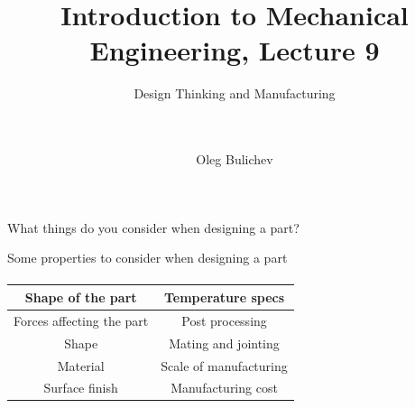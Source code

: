 \documentclass[aspectratio=169]{beamer}
\title[IME]{Introduction to Mechanical Engineering, Lecture 9} %
\subtitle{Design Thinking and Manufacturing  
\\ \   \\   
\ } %
\author{Oleg Bulichev}
\newcommand{\fbckg}[1]{\usebackgroundtemplate{\texttt{[image: \#1]}}}%
\begin{document}
\setlength{\abovedisplayskip}{0pt}
\setlength{\belowdisplayskip}{0pt}
\setlength{\abovedisplayshortskip}{0pt}
\setlength{\belowdisplayshortskip}{0pt}

\fbckg{fibeamer/figs/title_page.png}

\fbckg{fibeamer/figs/common.png}

\note{\scriptsize \begin{itemize}
        \item \
    \end{itemize}}

\begin{frame}[c]{}
    \framesubtitle{}
        \LARGE \centering
        What things do you consider when designing a part?
    \end{frame}

\begin{frame}[c]{Some properties to consider when designing a part}
\framesubtitle{}
\begin{table}[H]
    \LARGE
    \centering
    \begin{tabular}{|c|c|}
    \hline
        \textbf{Shape of the part} & \textbf{Temperature specs} \\ \hline
        Forces affecting the part & Post processing \\ 
        Shape & Mating and jointing \\ 
        Material & Scale of manufacturing \\ 
        Surface finish & Manufacturing cost \\ \hline
    \end{tabular}
\end{table}
\end{frame}
\end{document}
